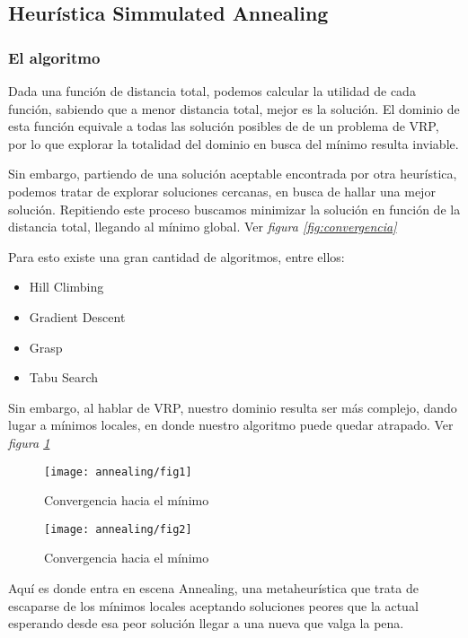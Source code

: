 \subsection{Heurística Simmulated Annealing}

\subsubsection{El algoritmo}
Dada una función de distancia total, podemos calcular la utilidad de cada función, sabiendo que a menor distancia total, mejor es la solución. El dominio de esta función equivale a todas las solución posibles de de un problema de VRP, por lo que explorar la totalidad del dominio en busca del mínimo resulta inviable.

Sin embargo, partiendo de una solución aceptable encontrada por otra heurística, podemos tratar de explorar soluciones cercanas, en busca de hallar una mejor solución. Repitiendo este proceso buscamos minimizar la solución en función de la distancia total, llegando al mínimo global. Ver \textit{figura \ref{fig:convergencia}}

Para esto existe una gran cantidad de algoritmos, entre ellos:

\begin{itemize}\itemsep0em
\item Hill Climbing
\item Gradient Descent
\item Grasp
\item Tabu Search
\end{itemize}

Sin embargo, al hablar de VRP, nuestro dominio resulta ser más complejo, dando lugar a mínimos locales, en donde nuestro algoritmo puede quedar atrapado. Ver \textit{figura \ref{fig:minimo-local}}


\begin{figure}[H]
	\centering
	\begin{minipage}[t]{.45\textwidth}
		\centering
		\texttt{[image: annealing/fig1]}
		\caption{Convergencia hacia el mínimo}
		\label{fig:convergencia}
	\end{minipage}\qquad
	\begin{minipage}[t]{.45\textwidth}
		\centering
		\texttt{[image: annealing/fig2]}
		\caption{Convergencia hacia el mínimo}
		\label{fig:minimo-local}
	\end{minipage}
\end{figure}	

Aquí es donde entra en escena Annealing, una metaheurística que trata de escaparse de los mínimos locales aceptando soluciones peores que la actual esperando desde esa peor solución llegar a una nueva que valga la pena.

